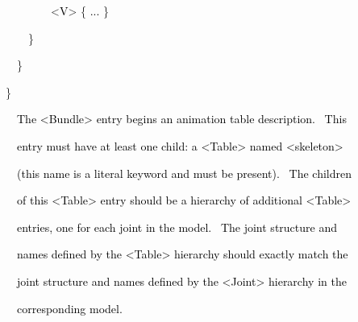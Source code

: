 \documentclass[a4paper]{article}
\newcommand\textstyleOOoComputerKeyWord[1]{\textrm{\textcolor[rgb]{0.0,0.0,0.5019608}{#1}}}
\newcommand\textstyleOOoAssemblerSpecialChar[1]{\textrm{\textcolor[rgb]{0.0,0.5019608,0.0}{#1}}}
\newcommand\textstyleOOoAssemblerIdent[1]{\textrm{\textcolor{black}{#1}}}
\begin{document}
{\color{black}
\textstyleOOoComputerKeyWord{\textcolor{black}{\ \ \ \ \ \ \ \ }}\textstyleOOoAssemblerSpecialChar{{\textless}}\textstyleOOoAssemblerIdent{V}\textstyleOOoAssemblerSpecialChar{{\textgreater}}\textstyleOOoComputerKeyWord{\textcolor{black}{
}}\textstyleOOoAssemblerSpecialChar{\{}\textstyleOOoComputerKeyWord{\textcolor{black}{
}}\textstyleOOoAssemblerIdent{...}\textstyleOOoComputerKeyWord{\textcolor{black}{
}}\textstyleOOoAssemblerSpecialChar{\}}}

\clearpage{\color{black}
\textstyleOOoComputerKeyWord{\textcolor{black}{\ \ \ \ \ \ }}\textstyleOOoAssemblerSpecialChar{\}}}

{\color{black}
\textstyleOOoComputerKeyWord{\textcolor{black}{\ \ \ \ }}\textstyleOOoAssemblerSpecialChar{\}}}

{\color{black}
\textstyleOOoComputerKeyWord{\textcolor{black}{\ \ }}\textstyleOOoAssemblerSpecialChar{\}}}

{\color{black}
\textstyleOOoAssemblerSpecialChar{\}}}


\bigskip

{\color{black}
\textstyleOOoComputerKeyWord{\textcolor{black}{\ \ The {\textless}Bundle{\textgreater} entry begins an animation table
description. \ This}}}

{\color{black}
\textstyleOOoComputerKeyWord{\textcolor{black}{\ \ entry must have at least one child: a {\textless}Table{\textgreater}
named {\textquotedbl}{\textless}skeleton{\textgreater}{\textquotedbl}}}}

{\color{black}
\textstyleOOoComputerKeyWord{\textcolor{black}{\ \ (this name is a literal keyword and must be present). \ The
children}}}

{\color{black}
\textstyleOOoComputerKeyWord{\textcolor{black}{\ \ of this {\textless}Table{\textgreater} entry should be a hierarchy of
additional {\textless}Table{\textgreater}}}}

{\color{black}
\textstyleOOoComputerKeyWord{\textcolor{black}{\ \ entries, one for each joint in the model. \ The joint structure
and}}}

{\color{black}
\textstyleOOoComputerKeyWord{\textcolor{black}{\ \ names defined by the {\textless}Table{\textgreater} hierarchy should
exactly match the}}}

{\color{black}
\textstyleOOoComputerKeyWord{\textcolor{black}{\ \ joint structure and names defined by the
{\textless}Joint{\textgreater} hierarchy in the}}}

{\color{black}
\textstyleOOoComputerKeyWord{\textcolor{black}{\ \ corresponding model.}}}
\end{document}
